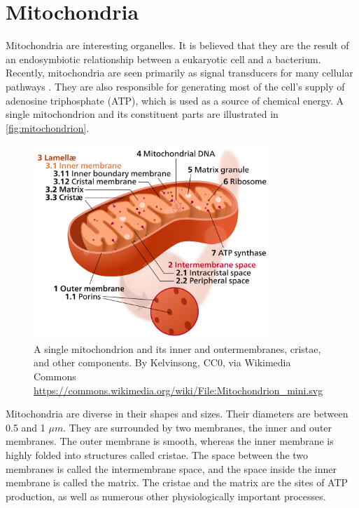 \documentclass[10pt,a4paper,oneside]{book}
\begin{document}
\section{Mitochondria}

Mitochondria are interesting organelles. It is believed that they are the result of an endosymbiotic relationship between a eukaryotic cell and a bacterium. Recently, mitochondria are seen primarily as signal transducers for many cellular pathways \cite{picard-cellmetabolism-2022}. They are also responsible for generating most of the cell's supply of adenosine triphosphate (ATP), which is used as a source of chemical energy. A single mitochondrion and its constituent parts are illustrated in \autoref{fig:mitochondrion}.

\begin{figure}[ht]
    \centering
    \includegraphics[width=0.8\textwidth]{mitochondrion.png}
    \caption{A single mitochondrion and its inner and outermembranes, cristae, and other components. By Kelvinsong, CC0, via Wikimedia Commons \url{https://commons.wikimedia.org/wiki/File:Mitochondrion_mini.svg}}
    \label{fig:mitochondrion}
\end{figure}

Mitochondria are diverse in their shapes and sizes. Their diameters are between 0.5 and 1 $\mu m$. They are surrounded by two membranes, the inner and outer membranes. The outer membrane is smooth, whereas the inner membrane is highly folded into structures called cristae. The space between the two membranes is called the intermembrane space, and the space inside the inner membrane is called the matrix. The cristae and the matrix are the sites of ATP production, as well as numerous other physiologically important processes.
\end{document}

